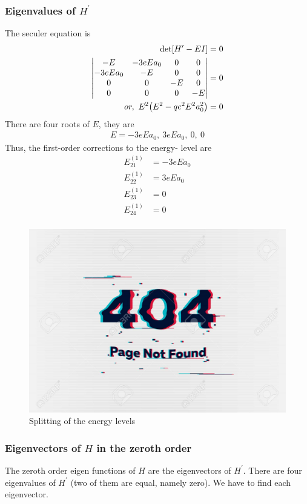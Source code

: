 	\subsubsection{Eigenvalues of $H^\prime$}
		
	The seculer equation is
	\begin{align*}
		\det [H^\prime - E I] &= 0 \\
		\mdet{-E & -3 e E a_0 & 0 & 0 \\
			-3 e E a_0 & -E & 0 & 0 \\
			0 & 0 & -E & 0\\
			0 & 0 & 0 & -E
	} &= 0 \\
	or,\ E^2 \qty(E^2 - q e^2 E^2 a_0^2) &= 0
	\end{align*}
	There are four roots of $E$, they are
	\begin{align*}
		E = - 3 e E a_0,\ 3 e E a_0,\ 0,\ 0
	\end{align*}
	Thus, the first-order corrections to the energy- level are
	\begin{align*}
		E_{2 1}^{(1)} &= - 3 e E a_0 \\		
		E_{2 2}^{(1)} &=  3 e E a_0 \\
		E_{2 3}^{(1)} &=  0 \\
		E_{2 4}^{(1)} &=  0 \\
	\end{align*}
	
	
	\begin{figure}
		\centering
		\includegraphics[width=0.5\linewidth]{Pictures/not-found.jpg}
		\caption{Splitting of the energy levels}
	\end{figure}

	\subsubsection{Eigenvectors of $H$ in the zeroth order}
		The zeroth order eigen functions of $H$ are the eigenvectors of $H^\prime$. There are four eigenvalues of $H^\prime$ (two of them are equal, namely zero). We have to find each eigenvector.\\
		
